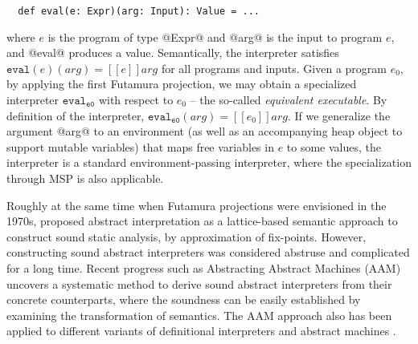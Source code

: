 \begin{lstlisting}
  def eval(e: Expr)(arg: Input): Value = ...
\end{lstlisting}

where $e$ is the program of type @Expr@ and @arg@ is the input to program $e$,
and @eval@ produces a value.
Semantically, the interpreter satisfies $ \texttt{eval}(e)(arg) = [\![ e ]\!] arg$ for all
programs and inputs. Given a program $e_0$, by applying the first Futamura
projection, we may obtain a specialized interpreter
$\texttt{eval}_{\texttt{e0}}$ with respect to $e_0$ -- the so-called \textit{equivalent executable}. 
By definition of the interpreter, 
$\texttt{eval}_{\texttt{e0}}(arg) = [\![ e_0 ]\!] arg $. If we generalize the
argument @arg@ to an environment (as well as an accompanying heap object to
support mutable variables) that maps free variables in $e$ to some
values, the interpreter is a standard environment-passing interpreter,
where the specialization through MSP is also applicable.

Roughly at the same time when Futamura projections were envisioned in the 1970s,
\citet{DBLP:conf/popl/CousotC77} proposed abstract interpretation as a
lattice-based semantic approach to construct sound static analysis, by
approximation of fix-points. However, constructing sound abstract interpreters
was considered abstruse and complicated for a long time.
Recent progress such as Abstracting Abstract Machines (AAM)
\cite{DBLP:conf/icfp/HornM10} uncovers a systematic method to derive sound
abstract interpreters from their concrete counterparts, where the soundness can
be easily established by examining the transformation of semantics. The AAM
approach also has been applied to different variants of definitional
interpreters and abstract machines \cite{DBLP:journals/jfp/HornM12,
DBLP:conf/icfp/HornM10, DBLP:journals/pacmpl/DaraisLNH17}.

